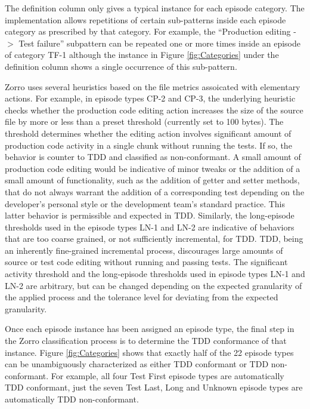 \documentclass[smallextended]{svjour3}     %
\begin{document}
The definition column 
only gives a typical instance for each episode category. The implementation 
allows repetitions of certain sub-patterns inside each episode category as prescribed by that category. 
For example, the ``Production editing -$>$ Test failure'' subpattern can be 
repeated one or more times inside 
an episode of category TF-1 although the instance  
in Figure \ref{fig:Categories} under the definition column
shows a single occurrence of this sub-pattern.

Zorro uses several heuristics based on the file metrics assoicated with elementary actions. For example, in episode types CP-2 and CP-3, the underlying heuristic checks whether the production code editing action increases the size of the source file by more or less than a preset threshold (currently set to 100 bytes). The threshold determines whether the editing action involves significant amount of production code activity in a single chunk without running the tests. If so, the behavior is counter to TDD and classified as non-conformant. A small amount of production code editing would be indicative of minor tweaks or the addition of a small amount of functionality, such as the addition of getter and setter methods, that do not always warrant the addition of a corresponding test depending on the developer's personal style or the development team's standard practice. This latter behavior is permissible and expected in TDD. Similarly, the long-episode thresholds used in the episode types LN-1 and LN-2 are  indicative of behaviors that are too coarse grained, or not sufficiently incremental, for TDD. TDD, being an inherently fine-grained incremental process, discourages large amounts of source or test code editing without running and passing tests.   The significant activity threshold and the long-episode thresholds used in episode types LN-1 and LN-2 are arbitrary, but can be changed depending on the expected granularity of the applied process and the tolerance level for deviating from the expected granularity. 

Once each episode instance has been assigned an episode type,
the final step in the Zorro classification process is to
determine the TDD conformance of that instance.  Figure
\ref{fig:Categories} shows that exactly half of the 22 episode types can be
unambiguously characterized as either TDD conformant or TDD non-conformant.
For example, all four Test First episode types are automatically TDD
conformant, just the seven Test Last, Long and Unknown episode
types are automatically TDD non-conformant.
\end{document}
